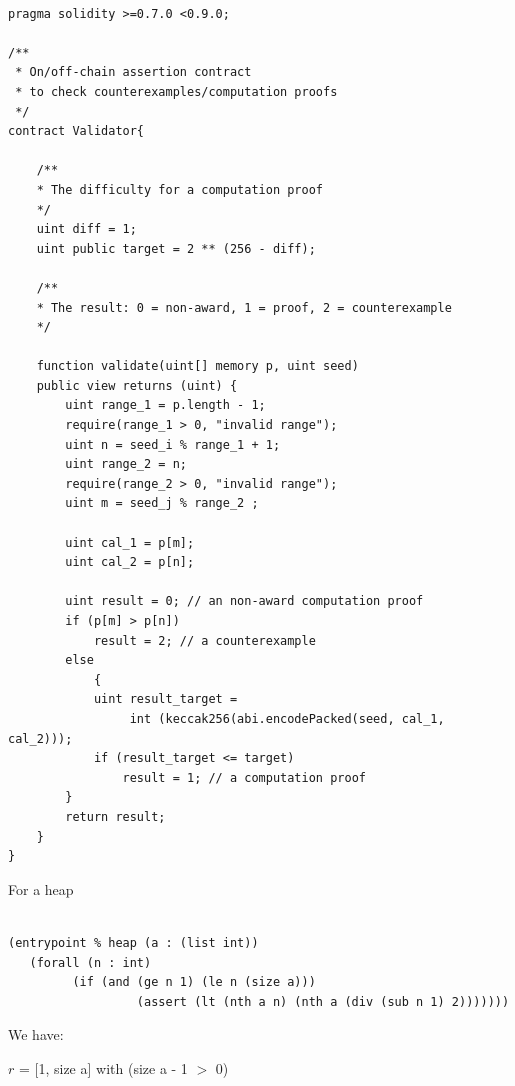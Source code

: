 \documentclass[runningheads]{llncs}
\begin{document}
\begin{lstlisting}[numbers=none]

pragma solidity >=0.7.0 <0.9.0;

/**
 * On/off-chain assertion contract 
 * to check counterexamples/computation proofs
 */
contract Validator{

    /**
    * The difficulty for a computation proof
    */
    uint diff = 1;
    uint public target = 2 ** (256 - diff); 

    /**
    * The result: 0 = non-award, 1 = proof, 2 = counterexample
    */

    function validate(uint[] memory p, uint seed)
    public view returns (uint) {
        uint range_1 = p.length - 1; 
        require(range_1 > 0, "invalid range");
        uint n = seed_i % range_1 + 1;
        uint range_2 = n;
        require(range_2 > 0, "invalid range");
        uint m = seed_j % range_2 ;
        
        uint cal_1 = p[m];
        uint cal_2 = p[n];

        uint result = 0; // an non-award computation proof 
        if (p[m] > p[n])  
            result = 2; // a counterexample
        else 
            {
            uint result_target = 
                 int (keccak256(abi.encodePacked(seed, cal_1, cal_2)));
            if (result_target <= target) 
                result = 1; // a computation proof      
        }             
        return result;           
    }
}

\end{lstlisting}

For a heap

\begin{lstlisting}[numbers=none]

(entrypoint % heap (a : (list int))
   (forall (n : int)
         (if (and (ge n 1) (le n (size a)))
                  (assert (lt (nth a n) (nth a (div (sub n 1) 2)))))))
\end{lstlisting}


\noindent We have:

$r$ = [1, size a] with (size a - 1 $>$ 0)
\end{document}
